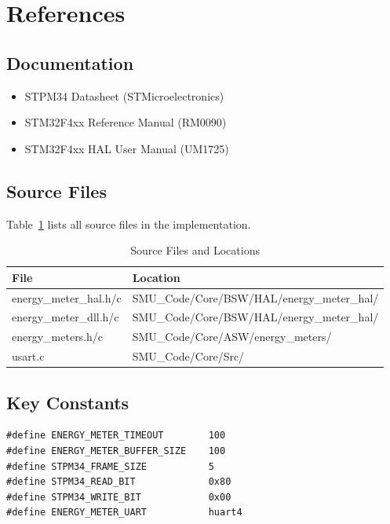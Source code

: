 \documentclass[11pt,a4paper]{article}
\begin{document}
\section{References}

\subsection{Documentation}

\begin{itemize}[noitemsep]
    \item STPM34 Datasheet (STMicroelectronics)
    \item STM32F4xx Reference Manual (RM0090)
    \item STM32F4xx HAL User Manual (UM1725)
\end{itemize}

\subsection{Source Files}

Table~\ref{tab:source_files} lists all source files in the implementation.

\begin{table}[H]
\centering
\small
\begin{tabular}{ll}
\toprule
\textbf{File} & \textbf{Location} \\
\midrule
energy\_meter\_hal.h/c & SMU\_Code/Core/BSW/HAL/energy\_meter\_hal/ \\
energy\_meter\_dll.h/c & SMU\_Code/Core/BSW/HAL/energy\_meter\_hal/ \\
energy\_meters.h/c & SMU\_Code/Core/ASW/energy\_meters/ \\
usart.c & SMU\_Code/Core/Src/ \\
\bottomrule
\end{tabular}
\caption{Source Files and Locations}
\label{tab:source_files}
\end{table}

\subsection{Key Constants}

\begin{lstlisting}
#define ENERGY_METER_TIMEOUT        100
#define ENERGY_METER_BUFFER_SIZE    100
#define STPM34_FRAME_SIZE           5
#define STPM34_READ_BIT             0x80
#define STPM34_WRITE_BIT            0x00
#define ENERGY_METER_UART           huart4
\end{lstlisting}
\end{document}

